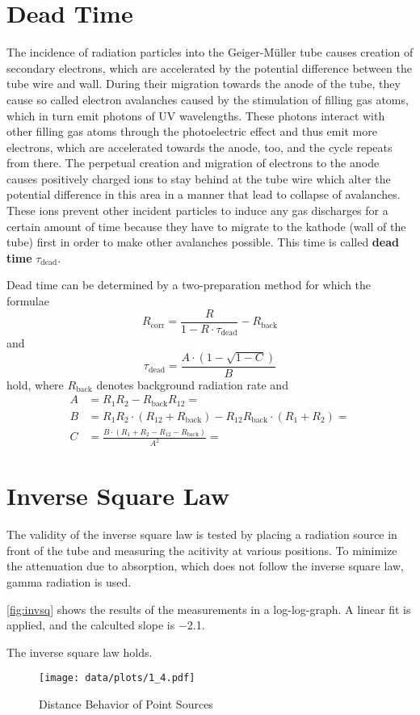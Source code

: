 \section{Dead Time}
The incidence of radiation particles into the Geiger-Müller tube causes creation of secondary electrons, which are accelerated by the potential difference between the tube wire and wall.
During their migration towards the anode of the tube, they cause so called electron avalanches caused by the stimulation of filling gas atoms, which in turn emit photons of UV wavelengths.
These photons interact with other filling gas atoms through the photoelectric effect and thus emit more electrons, which are accelerated towards the anode, too, and the cycle repeats from there.
The perpetual creation and migration of electrons to the anode causes positively charged ions to stay behind at the tube wire which alter the potential difference in this area in a manner that lead to collapse of avalanches.
These ions prevent other incident particles to induce any gas discharges for a certain amount of time because they have to migrate to the kathode (wall of the tube) first in order to make other avalanches possible.
This time is called \textbf{dead time} $\tau_\text{dead}$.

Dead time can be determined by a two-preparation method for which the formulae
\begin{equation*}
	R_\text{corr}=\frac{R}{1-R\cdot\tau_\text{dead}}-R_\text{back}
\end{equation*}
and
\begin{equation*}
	\tau_\text{dead}=\frac{A\cdot\left(1-\sqrt{1-C}\right)}{B}
\end{equation*}
hold, where $R_\text{back}$ denotes background radiation rate and
\begin{align*}
	A &= R_1R_2-R_\text{back}R_{12}= \\
	B &= R_1R_2\cdot\left(R_{12}+R_\text{back}\right)-R_{12}R_\text{back}\cdot\left(R_1+R_2\right)= \\
	C &= \frac{B\cdot\left(R_1+R_2-R_{12}-R_\text{back}\right)}{A^2}=
\end{align*}

\section{Inverse Square Law}
The validity of the inverse square law is tested by placing a radiation source in front of the tube and measuring the acitivity at various positions.
To minimize the attenuation due to absorption, which does not follow the inverse square law, gamma radiation is used.

\autoref{fig:invsq} shows the results of the measurements in a log-log-graph.
A linear fit is applied, and the calculted slope is \num{-2.1}.

The inverse square law holds.

\begin{figure}[tb]
	\centering
	\texttt{[image: data/plots/1\_4.pdf]}
	\caption{Distance Behavior of Point Sources}
	\label{fig:invsq}
\end{figure}
